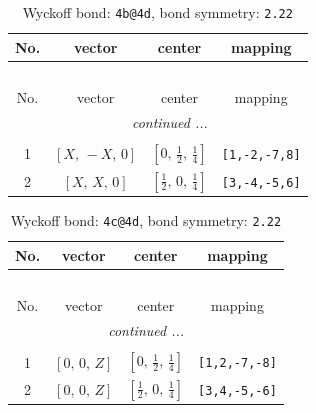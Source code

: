 \documentclass[fleqn,8pt]{jsarticle}
\begin{document}
\renewcommand{\arraystretch}{1.2}
\begin{longtable}{cccc}
\caption{Wyckoff bond: {\tt 4b@4d}, bond symmetry: {\tt 2.22}}
 \\
 \hline \hline
No. & vector & center & mapping \\ \hline \endfirsthead

\multicolumn{3}{l}{\tablename\ \thetable{}} \\
 \hline \hline
No. & vector & center & mapping \\ \hline \endhead

 \hline \hline
\multicolumn{3}{r}{\footnotesize\it continued ...} \\ \endfoot

 \hline \hline
\multicolumn{3}{r}{} \\ \endlastfoot

1 & $\left[ X,\, - X,\, 0 \right]$ & $\left[ 0,\, \frac{1}{2},\, \frac{1}{4} \right]$ & {\tt [1,-2,-7,8]} \\ \hline
2 & $\left[ X,\, X,\, 0 \right]$ & $\left[ \frac{1}{2},\, 0,\, \frac{1}{4} \right]$ & {\tt [3,-4,-5,6]} \\
\end{longtable}
\renewcommand{\arraystretch}{1.2}
\begin{longtable}{cccc}
\caption{Wyckoff bond: {\tt 4c@4d}, bond symmetry: {\tt 2.22}}
 \\
 \hline \hline
No. & vector & center & mapping \\ \hline \endfirsthead

\multicolumn{3}{l}{\tablename\ \thetable{}} \\
 \hline \hline
No. & vector & center & mapping \\ \hline \endhead

 \hline \hline
\multicolumn{3}{r}{\footnotesize\it continued ...} \\ \endfoot

 \hline \hline
\multicolumn{3}{r}{} \\ \endlastfoot

1 & $\left[ 0,\, 0,\, Z \right]$ & $\left[ 0,\, \frac{1}{2},\, \frac{1}{4} \right]$ & {\tt [1,2,-7,-8]} \\ \hline
2 & $\left[ 0,\, 0,\, Z \right]$ & $\left[ \frac{1}{2},\, 0,\, \frac{1}{4} \right]$ & {\tt [3,4,-5,-6]} \\
\end{longtable}
\renewcommand{\arraystretch}{1.2}
\end{document}
